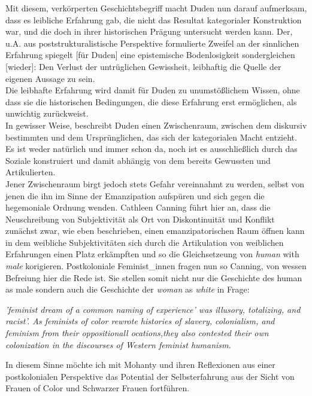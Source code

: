 \noindent Mit diesem, verkörperten Geschichtsbegriff macht Duden nun darauf aufmerksam,
dass es \glqq leibliche Erfahrung gab, die nicht das Resultat kategorialer
Konstruktion war, und die doch in ihrer historischen Prägung untersucht werden
kann.\grqq \footnotemark {} Der, u.A. aus poststrukturalistische Perspektive formulierte Zweifel
\glqq an der sinnlichen Erfahrung spiegelt [für Duden] eine epistemische
Bodenlosigkeit sondergleichen [wieder]: Den Verlust der untrüglichen
Gewissheit, leibhaftig die Quelle der eigenen Aussage zu sein.\grqq\footnotemark {}\\
Die leibhafte
Erfahrung wird damit für Duden zu unumstößlichem Wissen, ohne dass sie die
historischen Bedingungen, die diese Erfahrung erst ermöglichen, als unwichtig
zurückweist. \\
In gewisser Weise, beschreibt Duden einen Zwischenraum, zwischen
dem diskursiv bestimmten und dem Ursprünglichen, das sich der kategorialen
Macht entzieht. Es ist weder natürlich und immer schon da, noch ist es
ausschließlich durch das Soziale konstruiert und damit abhängig von dem bereits
Gewussten und Artikulierten. \\

\noindent Jener Zwischenraum birgt jedoch stets Gefahr vereinnahmt zu werden, selbst von
jenen die ihn im Sinne der Emanzipation aufspüren und sich gegen die
hegemoniale Ordnung wenden. Cathleen Canning \footnotemark {} führt hier an, dass die
Neuschreibung von Subjektivität als Ort von Diskontinuität und Konflikt
zunächst zwar, wie eben beschrieben, einen emanzipatorischen Raum öffnen kann
in dem weibliche Subjektivitäten sich durch die Artikulation von weiblichen
Erfahrungen einen Platz erkämpften und so die Gleichsetzeung von \textit{human} with
\textit{male} korigieren. Postkoloniale Feminist\_innen fragen nun so Canning,
von wessen Befreiung hier die Rede ist. Sie stellen somit nicht nur die
Geschichte des human as male sondern auch die Geschichte der \textit{woman} as
\textit{white} in
Frage:
\begin{myenv}
 \textit{
 \glqq[...]'feminist dream of a common naming of experience' was illusory,
 totalizing, and racist'. As feminists of color rewrote histories of slavery,
 colonialism, and feminism from their oppositionall ocations,they also
 contested their own colonization in the discourses of Western feminist
 humanism.\grqq \footnotemark {} }
\end{myenv}
In diesem Sinne möchte ich mit Mohanty und ihren Reflexionen aus einer
postkolonialen Perspektive das Potential der Selbsterfahrung aus der Sicht von
Frauen of Color und Schwarzer Frauen fortführen.\\

